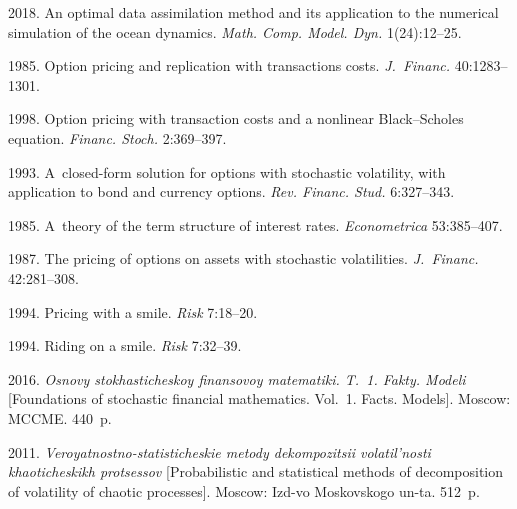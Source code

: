 
 \begin{multicols}{2}

\renewcommand{\bibname}{\protect\rmfamily References}

{\small\frenchspacing
 {%

 \begin{thebibliography}{99}
 2018. An optimal data assimilation method and its application to the 
 numerical simulation of the ocean dynamics. \textit{Math.
 Comp. Model. Dyn.} 1(24):12--25.

1985. Option pricing and replication with transactions costs. 
\textit{J.~Financ.} 40:1283--1301.

1998. Option pricing with transaction costs and a nonlinear 
Black--Scholes equation. \textit{Financ. Stoch.} 2:369--397.

 1993. A~closed-form solution for options
 with stochastic volatility, with application to bond and 
 currency options. \textit{Rev. Financ. Stud.} 6:327--343.

 1985. A~theory of the term structure of interest rates. 
 \textit{Econometrica} 53:385--407.

 1987. The pricing of options on assets 
with stochastic volatilities. \textit{J.~Financ.} 42:281--308.

 1994. Pricing with a smile. \textit{Risk} 7:18--20.

 1994. Riding on a smile. \textit{Risk} 7:32--39.

 2016. 
\textit{Osnovy stokhasticheskoy finansovoy matematiki. T.~1. Fakty. Modeli} 
[Foundations of stochastic financial mathematics. Vol.~1. Facts. Models]. 
Moscow: MCCME. 440~p.

 2011. 
\textit{Veroyatnostno-statisticheskie metody dekompozitsii
volatil'nosti khaoticheskikh protsessov} [Probabilistic and statistical 
methods of decomposition of volatility of chaotic processes]. Moscow: 
Izd-vo Moskovskogo un-ta. 512~p.


\end{thebibliography}}}
\end{multicols}
